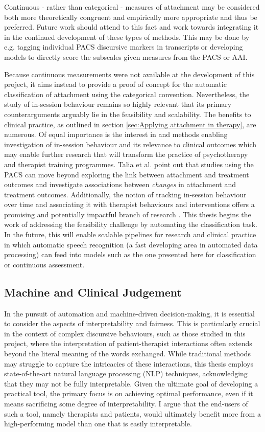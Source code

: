 \documentclass[12pt]{report}
\begin{document}
Continuous - rather than categorical - measures of attachment may be considered both more theoretically congruent and empirically more appropriate and thus be preferred.
Future work should attend to this fact and work towards integrating it in the continued development of these types of methods.
This may be done by e.g. tagging individual PACS discursive markers in transcripts or developing models to directly score the subscales given measures from the PACS or AAI.

Because continuous measurements were not available at the development of this project, it aims instead to provide a proof of concept for the automatic classification of attachment using the categorical convention.
Nevertheless, the study of in-session behaviour remains so highly relevant that its primary counterarguments arguably lie in the feasibility and scalability.
The benefits to clinical practice, as outlined in section \ref{sec:Applying attachment in therapy}, are numerous. Of equal importance is the interest in and methods enabling investigation of in-session behaviour and its relevance to clinical outcomes which may enable further research that will transform the practice of psychotherapy and therapist training programmes.
Talia et al. \cite{Talia2017} point out that studies using the PACS can move beyond exploring the link between attachment and treatment outcomes and investigate associations between \textit{changes} in attachment and treatment outcomes.
Additionally, the notion of tracking in-session behaviour over time and associating it with therapist behaviours and interventions offers a promising and potentially impactful branch of research \cite{Slade2016, Talia2017}.
This thesis begins the work of addressing the feasibility challenge by automating the classification task.
In the future, this will enable scalable pipelines for research and clinical practice in which automatic speech recognition (a fast developing area in automated data processing) can feed into models such as the one presented here for classification or continuous assessment.

\subsection*{Machine and Clinical Judgement}
In the pursuit of automation and machine-driven decision-making, it is essential to consider the aspects of interpretability and fairness.
This is particularly crucial in the context of complex discursive behaviours, such as those studied in this project, where the interpretation of patient-therapist interactions often extends beyond the literal meaning of the words exchanged.
While traditional methods may struggle to capture the intricacies of these interactions, this thesis employs state-of-the-art natural language processing (NLP) techniques, acknowledging that they may not be fully interpretable.
Given the ultimate goal of developing a practical tool, the primary focus is on achieving optimal performance, even if it means sacrificing some degree of interpretability.
I argue that the end-users of such a tool, namely therapists and patients, would ultimately benefit more from a high-performing model than one that is easily interpretable.
\end{document}
